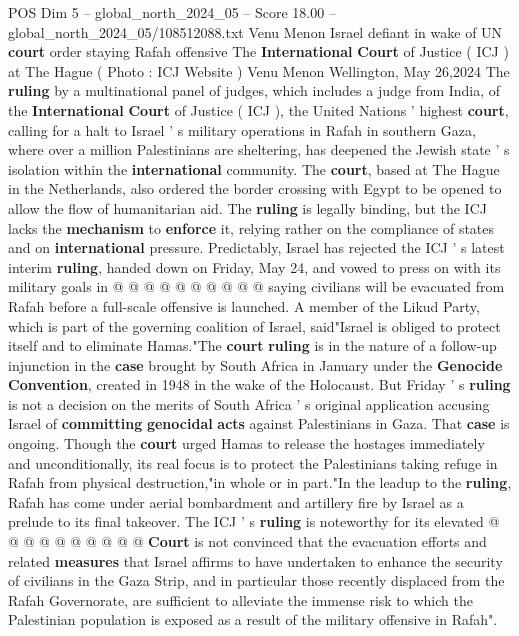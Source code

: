 \begin{textsample}{POS Dim 5 – global\_north\_2024\_05 – Score 18.00 – global\_north\_2024\_05/108512088.txt}  \label{ex:f5_pos_169}
Venu Menon Israel defiant in wake of UN \textbf{court} order staying Rafah offensive The \textbf{International} \textbf{Court} of Justice ( ICJ ) at The Hague ( Photo : ICJ Website ) Venu Menon Wellington, May 26,2024 The \textbf{ruling} by a multinational panel of judges, which includes a judge from India, of the \textbf{International} \textbf{Court} of Justice ( ICJ ), the United Nations ' highest \textbf{court}, calling for a halt to Israel ' s military operations in Rafah in southern Gaza, where over a million Palestinians are sheltering, has deepened the Jewish state ' s isolation within the \textbf{international} community.
The \textbf{court}, based at The Hague in the Netherlands, also ordered the border crossing with Egypt to be opened to allow the flow of humanitarian aid.
The \textbf{ruling} is legally binding, but the ICJ lacks the \textbf{mechanism} to \textbf{enforce} it, relying rather on the compliance of states and on \textbf{international} pressure.
Predictably, Israel has rejected the ICJ ' s latest interim \textbf{ruling}, handed down on Friday, May 24, and vowed to press on with its military goals in @ @ @ @ @ @ @ @ @ @ saying civilians will be evacuated from Rafah before a full-scale offensive is launched.
A member of the Likud Party, which is part of the governing coalition of Israel, said"Israel is obliged to protect itself and to eliminate Hamas."The \textbf{court} \textbf{ruling} is in the nature of a follow-up injunction in the \textbf{case} brought by South Africa in January under the \textbf{Genocide} \textbf{Convention}, created in 1948 in the wake of the Holocaust.
But Friday ' s \textbf{ruling} is not a decision on the merits of South Africa ' s original application accusing Israel of \textbf{committing} \textbf{genocidal} \textbf{acts} against Palestinians in Gaza.
That \textbf{case} is ongoing.
Though the \textbf{court} urged Hamas to release the hostages immediately and unconditionally, its real focus is to protect the Palestinians taking refuge in Rafah from physical destruction,"in whole or in part."In the leadup to the \textbf{ruling}, Rafah has come under aerial bombardment and artillery fire by Israel as a prelude to its final takeover.
The ICJ ' s \textbf{ruling} is noteworthy for its elevated @ @ @ @ @ @ @ @ @ @ \textbf{Court} is not convinced that the evacuation efforts and related \textbf{measures} that Israel affirms to have undertaken to enhance the security of civilians in the Gaza Strip, and in particular those recently displaced from the Rafah Governorate, are sufficient to alleviate the immense risk to which the Palestinian population is exposed as a result of the military offensive in Rafah".

\end{textsample}

